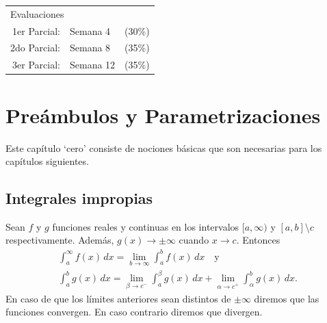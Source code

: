 \documentclass[mid,fleqn,draft,twoside]{notasdeclase}
\newcommand{\inte}[4]{\int_{#1}^{#2} #3\, d#4}
\begin{document}
\frontmatter
\begin{titlepage}

\end{titlepage}

\tableofcontents

\vspace{1em}
\begin{flushleft}
	\begin{tabular}[c]{rlr} 
	\multicolumn{3}{l}{\LARGE Evaluaciones} \\[1.5em]
	 { 1}er Parcial: & Semana 4 &({30}\%) \\
	 { 2}do Parcial: & Semana 8 &({35}\%) \\
	 { 3}er Parcial: & Semana 12 &({35}\%) \\
\end{tabular}

\end{flushleft}
\mainmatter
\setcounter{chapter}{-1}
\chapter{Preámbulos y Parametrizaciones}

\noindent
Este capítulo `cero' consiste de nociones básicas que son necesarias para los capítulos siguientes. 

\section{Integrales impropias}

\begin{defi}[convergencia]
	Sean $f$ y $g$ funciones reales y continuas en los intervalos $[a,\infty)$ y $[a,b]\setminus c$ respectivamente. Además, $ g(x) \to \pm\infty$ cuando $x\to c$. Entonces
	\begin{gather}
		\inte{a}{\infty}{f(x)}{x} = \lim\limits_{b\to\infty}\inte{a}{b}{f(x)}{x} \quad \text{y} \\
		\inte{a}{b}{g(x)}{x} = \lim\limits_{\beta\to c^{-}}\inte{a}{\beta}{g(x)}{x} + \lim\limits_{\alpha\to c^{+}}\inte{\alpha}{b}{g(x)}{x}.
	\end{gather}
	En caso de que los límites anteriores sean distintos de $\pm\infty$ diremos que las funciones convergen. En caso contrario diremos que divergen.
	
\end{defi}
\end{document}
